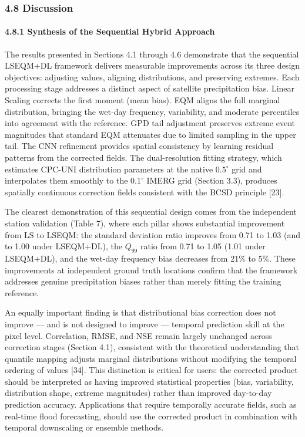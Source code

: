 \documentclass[
]{article}
\begin{document}
\subsubsection{4.8 Discussion}\label{discussion}

\paragraph{4.8.1 Synthesis of the Sequential Hybrid
Approach}\label{synthesis-of-the-sequential-hybrid-approach}

The results presented in Sections 4.1 through 4.6 demonstrate that the
sequential LSEQM+DL framework delivers measurable improvements across
its three design objectives: adjusting values, aligning distributions,
and preserving extremes. Each processing stage addresses a distinct
aspect of satellite precipitation bias. Linear Scaling corrects the
first moment (mean bias). EQM aligns the full marginal distribution,
bringing the wet-day frequency, variability, and moderate percentiles
into agreement with the reference. GPD tail adjustment preserves extreme
event magnitudes that standard EQM attenuates due to limited sampling in
the upper tail. The CNN refinement provides spatial consistency by
learning residual patterns from the corrected fields. The
dual-resolution fitting strategy, which estimates CPC-UNI distribution
parameters at the native \(0.5^{\circ}\) grid and interpolates them
smoothly to the \(0.1^{\circ}\) IMERG grid (Section 3.3), produces
spatially continuous correction fields consistent with the BCSD
principle {[}23{]}.

The clearest demonstration of this sequential design comes from the
independent station validation (Table 7), where each pillar shows
substantial improvement from LS to LSEQM: the standard deviation ratio
improves from 0.71 to 1.03 (and to 1.00 under LSEQM+DL), the \(Q_{99}\)
ratio from 0.71 to 1.05 (1.01 under LSEQM+DL), and the wet-day frequency
bias decreases from 21\% to 5\%. These improvements at independent
ground truth locations confirm that the framework addresses genuine
precipitation biases rather than merely fitting the training reference.

An equally important finding is that distributional bias correction does
not improve --- and is not designed to improve --- temporal prediction
skill at the pixel level. Correlation, RMSE, and NSE remain largely
unchanged across correction stages (Section 4.1), consistent with the
theoretical understanding that quantile mapping adjusts marginal
distributions without modifying the temporal ordering of values
{[}34{]}. This distinction is critical for users: the corrected product
should be interpreted as having improved statistical properties (bias,
variability, distribution shape, extreme magnitudes) rather than
improved day-to-day prediction accuracy. Applications that require
temporally accurate fields, such as real-time flood forecasting, should
use the corrected product in combination with temporal downscaling or
ensemble methods.
\end{document}

